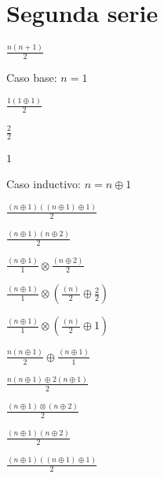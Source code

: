 \documentclass{article}
\begin{document}
\section{Segunda serie}
$\frac{n(n+1)}{2}$
\begin{center}
    Caso base: $n = 1$
\end{center}
\begin{center}
    $\frac{1(1 \oplus 1)}{2}$
\end{center}
\begin{center}
    $\frac{2}{2}$
\end{center}
\begin{center}
    $1$
\end{center}
\begin{center}
    Caso inductivo: $n = n \oplus 1$
\end{center}
\begin{center}
    $\frac{(n \oplus 1)((n \oplus 1) \oplus 1)}{2}$
\end{center}
\begin{center}
    $\frac{(n \oplus 1)(n \oplus 2)}{2}$
\end{center}
\begin{center}
    $\frac{(n \oplus 1) }{1}\otimes \frac{(n \oplus 2)}{2}$
\end{center}
\begin{center}
    $\frac{(n \oplus 1) }{1}\otimes (\frac{(n)}{2} \oplus \frac{2}{2})$
\end{center}
\begin{center}
    $\frac{(n \oplus 1) }{1}\otimes (\frac{(n)}{2} \oplus 1)$
\end{center}
\begin{center}
    $\frac{n(n \oplus 1) }{2}\oplus \frac{(n \oplus 1)}{1}$
\end{center}
\begin{center}
    $\frac{n(n \oplus 1) \oplus 2(n \oplus 1)}{2}$
\end{center}
\begin{center}
    $\frac{(n \oplus 1) \otimes (n \oplus 2)}{2}$
\end{center}
\begin{center}
    $\frac{(n \oplus 1)(n \oplus 2)}{2}$
\end{center}
\begin{center}
    $\frac{(n \oplus 1)((n \oplus 1) \oplus 1)}{2}$
\end{center}
\end{document}
